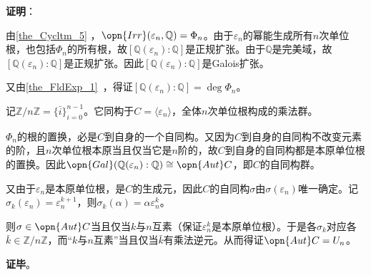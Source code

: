 \textbf{证明}：

由\autoref{the_Cycltm_5} ，$\opn{Irr}(\varepsilon_n, \mathbb{Q})=\Phi_n$。由于$\varepsilon_n$的幂能生成所有$n$次单位根，也包括$\Phi_n$的所有根，故$[\mathbb{Q}(\varepsilon_n):\mathbb{Q}]$是正规扩张。由于$\mathbb{Q}$是完美域，故$[\mathbb{Q}(\varepsilon_n):\mathbb{Q}]$是正规扩张。因此$[\mathbb{Q}(\varepsilon_n):\mathbb{Q}]$是Galois扩张。

又由\autoref{the_FldExp_1}~，得证$[\mathbb{Q}(\varepsilon_n):\mathbb{Q}]=\deg \Phi_n$。

记$\mathbb{Z}/n\mathbb{Z}=\{\bar{i}\}_{i=0}^{n-1}$。它同构于$C=\langle \varepsilon_n \rangle$，全体$n$次单位根构成的乘法群。

$\Phi_n$的根的置换，必是$C$到自身的一个自同构。又因为$C$到自身的自同构不改变元素的阶，且$n$次单位根本原当且仅当它是$n$阶的，故$C$到自身的自同构都是本原单位根的置换。因此$\opn{Gal}(\mathbb{Q}(\varepsilon_n):\mathbb{Q})\cong \opn{Aut}C$，即$C$的自同构群。

又由于$\varepsilon_n$是本原单位根，是$C$的生成元，因此$C$的自同构$\sigma$由$\sigma(\varepsilon_n)$唯一确定。记$\sigma_k(\varepsilon_n)=\varepsilon_n^{k+1}$，则$\sigma_k(\alpha)=\alpha\varepsilon_n^k$。

则$\sigma\in \opn{Aut}C$当且仅当$k$与$n$互素（保证$\varepsilon_n^k$是本原单位根）。于是各$\sigma_k$对应各$\bar{k}\in\mathbb{Z}/n\mathbb{Z}$，而“$k$与$n$互素”当且仅当$\bar{k}$有乘法逆元。从而得证$\opn{Aut}C=U_n$。

\textbf{证毕}。
































